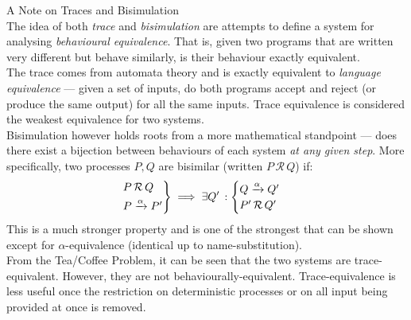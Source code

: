     \begin{remark*}{A Note on Traces and Bisimulation\\}
        The idea of both \textit{trace} and \textit{bisimulation} are attempts to define a system for analysing \textit{behavioural equivalence}.
        That is, given two programs that are written very different but behave similarly, is their behaviour exactly equivalent. \\

        The trace comes from automata theory and is exactly equivalent to \textit{language equivalence} --- given a set of inputs, do both programs accept and reject (or produce the same output) for all the same inputs.
        Trace equivalence is considered the weakest equivalence for two systems. \\

        Bisimulation however holds roots from a more mathematical standpoint --- does there exist a bijection between behaviours of each system \textit{at any given step}.
        More specifically, two processes $P, Q$ are bisimilar (written $P \, \mathcal{R} \, Q$) if:
        \begin{equation*}
            \begin{rcases}
                P \, \mathcal{R} \, Q \\
                P \xrightarrow{\alpha} P' \\
            \end{rcases} \implies \exists Q' \, :
            \begin{cases}
                Q \xrightarrow{\alpha} Q' \\
                P' \, \mathcal{R} \, Q' \\
            \end{cases}
        \end{equation*}
        This is a much stronger property and is one of the strongest that can be shown except for $\alpha$-equivalence (identical up to name-substitution). \\
        
        From the Tea/Coffee Problem, it can be seen that the two systems are trace-equivalent.
        However, they are not behaviourally-equivalent.
        Trace-equivalence is less useful once the restriction on deterministic processes or on all input being provided at once is removed.
    \end{remark*}


